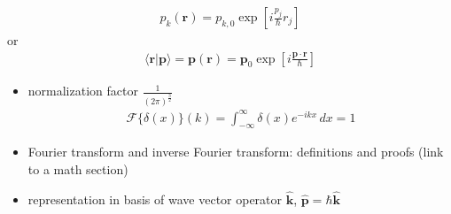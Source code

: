 \documentclass[letterpaper,10pt,english]{jupyterBook}
\begin{document}
\begin{itemize}
\begin{equation*}
\begin{split}p_k(\mathbf{r}) = p_{k,0} \exp \left[ i \frac{p_j}{\hbar} r_j \right]\end{split}
\end{equation*}
\sphinxAtStartPar
or
\begin{equation*}
\begin{split}\langle \mathbf{r} | \mathbf{p} \rangle = \mathbf{p}(\mathbf{r}) = \mathbf{p}_0 \exp \left[ i \frac{\mathbf{p} \cdot \mathbf{r}}{\hbar} \right]\end{split}
\end{equation*}
\sphinxAtStartPar
{}
\begin{itemize}
\item {} 
\sphinxAtStartPar
normalization factor \(\frac{1}{(2 \pi)^{\frac{3}{2}}}\)
\begin{equation*}
\begin{split}\mathscr{F}\{ \delta(x) \}(k) = \int_{-\infty}^{\infty} \delta(x) e^{-ikx} \, dx = 1\end{split}
\end{equation*}
\item {} 
\sphinxAtStartPar
Fourier transform and inverse Fourier transform: definitions and proofs (link to a math section)

\item {} 
\sphinxAtStartPar
representation in basis of wave vector operator \(\hat{\mathbf{k}}\), \(\hat{\mathbf{p}} = \hbar \hat{\mathbf{k}}\)

\end{itemize}

\end{itemize}
\end{document}
